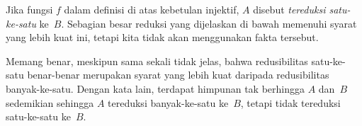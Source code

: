 \documentclass[../../../include/open-logic-section]{subfiles}
\begin{document}
Jika fungsi $f$ dalam definisi di atas kebetulan injektif, $A$ disebut
\emph{tereduksi satu-ke-satu} ke~$B$. Sebagian besar reduksi yang dijelaskan di
bawah memenuhi syarat yang lebih kuat ini, tetapi kita tidak akan menggunakan
fakta tersebut.

\begin{digress}
Memang benar, meskipun sama sekali tidak jelas, bahwa redusibilitas
satu-ke-satu benar-benar merupakan syarat yang lebih kuat daripada
redusibilitas banyak-ke-satu. Dengan kata lain, terdapat himpunan tak berhingga
$A$ dan~$B$ sedemikian sehingga $A$ tereduksi banyak-ke-satu ke~$B$, tetapi
tidak tereduksi satu-ke-satu ke~$B$.
\end{digress}
\end{document}
